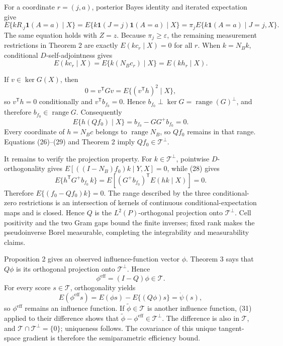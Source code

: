 For a coordinate \(r=(j,a)\), posterior Bayes identity and iterated expectation give
\[
E\{kR_{\cdot j}\mathbf 1(A=a)\mid X\}
=E\{k\mathbf 1(J=j)\mathbf 1(A=a)\mid X\}
=\pi_jE\{k\mathbf 1(A=a)\mid J=j,X\}. \tag{27}
\]
The same equation holds with \(Z=z\).  Because \(\pi_j\geq\varepsilon\), the remaining measurement restrictions in Theorem 2 are exactly \(E(kc_r\mid X)=0\) for all \(r\).  When \(k=N_Bk\), conditional \(D\)-self-adjointness gives
\[
E(kc_r\mid X)=E\{k(N_Bc_r)\mid X\}=E(kh_r\mid X). \tag{28}
\]

If \(v\in\ker G(X)\), then
\[
0=v^{\mathsf T}Gv=E\{(v^{\mathsf T}h)^2\mid X\},
\]
so \(v^{\mathsf T}h=0\) conditionally and \(v^{\mathsf T}b_{f_0}=0\).  Hence \(b_{f_0}\perp\ker G=\operatorname{range}(G)^\perp\), and therefore \(b_{f_0}\in\operatorname{range}G\).  Consequently
\[
E\{h(Qf_0)\mid X\}=b_{f_0}-GG^+b_{f_0}=0. \tag{29}
\]
Every coordinate of \(h=N_Bc\) belongs to \(\operatorname{range}N_B\), so \(Qf_0\) remains in that range.  Equations (26)--(29) and Theorem 2 imply \(Qf_0\in\mathcal T^\perp\).

It remains to verify the projection property.  For \(k\in\mathcal T^\perp\), pointwise \(D\)-orthogonality gives
\(E[((I-N_B)f_0)k\mid Y,X]=0\), while (28) gives
\[
E\{h^{\mathsf T}G^+b_{f_0}\,k\}
=E[(G^+b_{f_0})^{\mathsf T}E(hk\mid X)]=0.
\]
Therefore \(E\{(f_0-Qf_0)k\}=0\).  The range described by the three conditional-zero restrictions is an intersection of kernels of continuous conditional-expectation maps and is closed.  Hence \(Q\) is the \(L^2(P)\)-orthogonal projection onto \(\mathcal T^\perp\).  Cell positivity and the two Gram gaps bound the finite inverses; fixed rank makes the pseudoinverse Borel measurable, completing the integrability and measurability claims.

Proposition 2 gives an observed influence-function vector \(\phi\).  Theorem 3 says that \(Q\phi\) is its orthogonal projection onto \(\mathcal T^\perp\).  Hence
\[
\phi^{\mathrm{eff}}=(I-Q)\phi\in\mathcal T. \tag{30}
\]
For every score \(s\in\mathcal T\), orthogonality yields
\[
E(\phi^{\mathrm{eff}}s)=E(\phi s)-E\{(Q\phi)s\}=\dot\psi(s), \tag{31}
\]
so \(\phi^{\mathrm{eff}}\) remains an influence function.  If \(\widetilde\phi\in\mathcal T\) is another influence function, (31) applied to their difference shows that \(\widetilde\phi-\phi^{\mathrm{eff}}\in\mathcal T^\perp\).  The difference is also in \(\mathcal T\), and \(\mathcal T\cap\mathcal T^\perp=\{0\}\); uniqueness follows.  The covariance of this unique tangent-space gradient is therefore the semiparametric efficiency bound.

